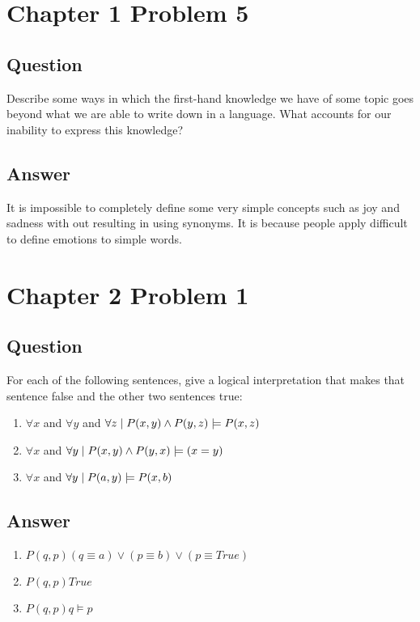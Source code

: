 \documentclass[10pt]{article}
\newcommand{\suchthat}{\;\ifnum\currentgrouptype=16 \middle\fi|\;}
\begin{document}
\section{Chapter 1 Problem 5}
\subsection{Question}
Describe some ways in which the ﬁrst-hand knowledge we have of some
topic goes beyond what we are able to write down in a language.
What accounts for our inability to express this knowledge?

\subsection{Answer}
It is impossible to completely define some very simple concepts
such as joy and sadness with out resulting in using synonyms.
It is because people apply difficult to define emotions to simple words.

\section{Chapter 2 Problem 1}
\subsection{Question}
For each of the following sentences, give a logical interpretation that makes
that sentence false and the other two sentences true:

\begin{enumerate}
	\item $ \forall x $ and $\forall y $ and $\forall z \suchthat  P(x,y) \land P(y,z) \models P(x,z) $
	\item $ \forall x $ and $\forall y \suchthat  P(x,y) \land P(y,x)  \models (x = y) $
	\item $ \forall x $ and $\forall y \suchthat  P(a,y) \models P(x,b) $
\end{enumerate}

\subsection{Answer}

\begin{enumerate}
	\item $ P(q,p) {(q \equiv a) \lor (p \equiv b) \lor (p \equiv True) } $
	\item $ P(q,p) {True} $
	\item $ P(q,p) {q \models p }  $
\end{enumerate}
\end{document}
